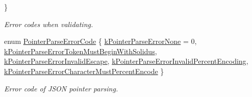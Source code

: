 \begin{DoxyCompactItemize}
 \}\begin{DoxyCompactList}\small\item\em Error codes when validating. \end{DoxyCompactList}
\item 
enum \hyperlink{group__RAPIDJSON__ERRORS_gacb2e274f33e54d91b96e9883a99a98be}{Pointer\+Parse\+Error\+Code} \{ \newline
\hyperlink{group__RAPIDJSON__ERRORS_ggacb2e274f33e54d91b96e9883a99a98bea81e2b6fbd1bf4ac890ddb7779265e3a0}{k\+Pointer\+Parse\+Error\+None} = 0, 
\hyperlink{group__RAPIDJSON__ERRORS_ggacb2e274f33e54d91b96e9883a99a98bea5821696a2ab6cbccdc8288cbe6e81c77}{k\+Pointer\+Parse\+Error\+Token\+Must\+Begin\+With\+Solidus}, 
\hyperlink{group__RAPIDJSON__ERRORS_ggacb2e274f33e54d91b96e9883a99a98bea4d2a7e511d717fd1d2f532ef5fcf821b}{k\+Pointer\+Parse\+Error\+Invalid\+Escape}, 
\hyperlink{group__RAPIDJSON__ERRORS_ggacb2e274f33e54d91b96e9883a99a98beac0c1b013c0db34dcc5a47fc1ee7a8c35}{k\+Pointer\+Parse\+Error\+Invalid\+Percent\+Encoding}, 
\newline
\hyperlink{group__RAPIDJSON__ERRORS_ggacb2e274f33e54d91b96e9883a99a98beabd7eae93627f74267009a03679b6dc38}{k\+Pointer\+Parse\+Error\+Character\+Must\+Percent\+Encode}
 \}\begin{DoxyCompactList}\small\item\em Error code of J\+S\+ON pointer parsing. \end{DoxyCompactList}
\end{DoxyCompactItemize}
